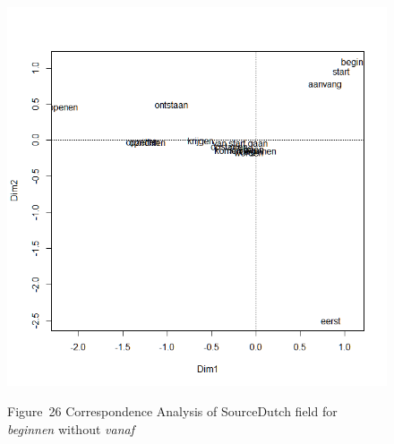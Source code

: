 \begin{figure}
\includegraphics[height=.3\textheight]{figures/Vandevoorde2-img26.png}
 


Figure~26  Correspondence Analysis of SourceDutch field for \textit{beginnen} without \textit{vanaf}

\end{figure}


